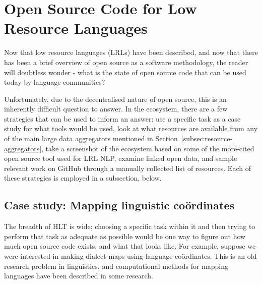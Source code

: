 \section{Open Source Code for Low Resource Languages}
\label{sec:endlangcode}

Now that low resource languages (LRLs) have been described, and now that there has been a brief overview of open source as a software methodology, the reader will doubtless wonder - what is the state of open source code that can be used today by language communities?


Unfortunately, due to the decentralised nature of open source, this is an inherently difficult question to answer. In the ecosystem, there are a few strategies that can be used to inform an answer: use a specific task as a case study for what tools would be used, look at what resources are available from any of the main large data aggregators mentioned in Section~\ref{subsec:resource-aggregators}, take a screenshot of the ecosystem based on some of the more-cited open source tool used for LRL NLP, examine linked open data, and sample relevant work on GitHub through a manually collected list of resources. Each of these strategies is employed in a subsection, below.

\subsection{Case study: Mapping linguistic co\"ordinates}

The breadth of HLT is wide; choosing a specific task within it and then trying to perform that task as adequate as possible would be one way to figure out how much open source code exists, and what that looks like. For example, suppose we were interested in making dialect maps using language co\"ordinates. This is an old research problem in linguistics, and computational methods for mapping languages have been described in some research. %


